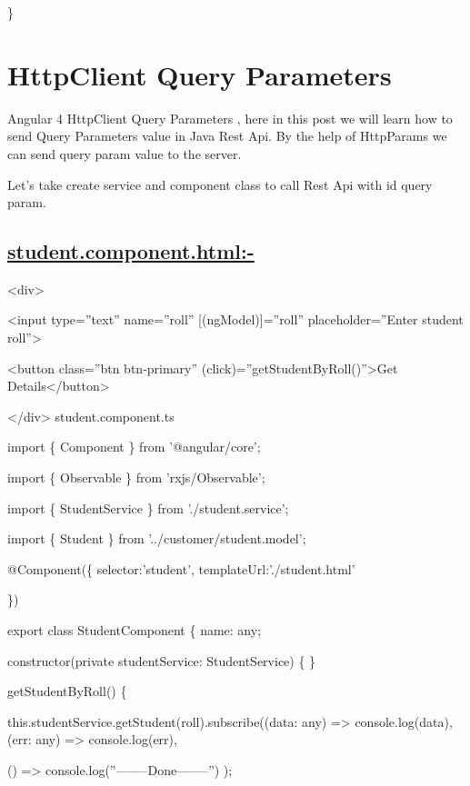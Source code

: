 \documentclass[11pt,twoside]{article}
\begin{document}
\}

\vspace{31\baselineskip}
\section*{HttpClient Query Parameters}

Angular 4 HttpClient Query Parameters , here in this post we will learn how to send Query Parameters value in Java Rest Api. By the help of HttpParams we can send query param value to the server.

\vspace{1\baselineskip}
Let's take create service and component class to call Rest Api with id query param.

\subsection*{\uline{student.component.html:-}}

\vspace{1\baselineskip}
<div>

<input type=”text” name=”roll” [(ngModel)]=”roll” placeholder=”Enter student roll”>

<button class=”btn btn-primary” (click)=”getStudentByRoll()”>Get Details</button> 

</div> student.component.ts

\vspace{1\baselineskip}
import \{ Component \} from '@angular/core';

import \{ Observable \} from 'rxjs/Observable';

import \{ StudentService \} from './student.service';

import \{ Student \} from '../customer/student.model'; 

@Component(\{ selector:'student', templateUrl:'./student.html' 

\})

export class StudentComponent \{ name: any;

constructor(private studentService: StudentService) \{ \}

getStudentByRoll() \{

  \hspace*{25}this.studentService.getStudent(roll).subscribe((data: any) => console.log(data), (err: any) => console.log(err),

  \hspace*{25}() => console.log(”——–Done——–”) );
\end{document}

